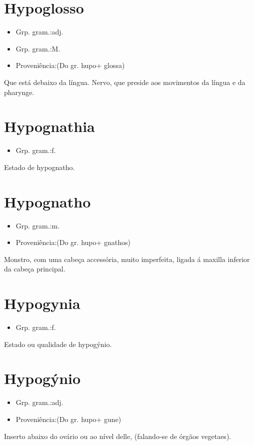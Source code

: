 \documentclass{article}
\begin{document}
\section{Hypoglosso}
\begin{itemize}
\item {Grp. gram.:adj.}
\end{itemize}
\begin{itemize}
\item {Grp. gram.:M.}
\end{itemize}
\begin{itemize}
\item {Proveniência:(Do gr. \textunderscore hupo\textunderscore  + \textunderscore glossa\textunderscore )}
\end{itemize}
Que está debaixo da língua.
Nervo, que preside aos movimentos da língua e da pharynge.
\section{Hypognathia}
\begin{itemize}
\item {Grp. gram.:f.}
\end{itemize}
Estado de hypognatho.
\section{Hypognatho}
\begin{itemize}
\item {Grp. gram.:m.}
\end{itemize}
\begin{itemize}
\item {Proveniência:(Do gr. \textunderscore hupo\textunderscore  + \textunderscore gnathos\textunderscore )}
\end{itemize}
Monstro, com uma cabeça accessória, muito imperfeita, ligada á maxilla inferior da cabeça principal.
\section{Hypogynia}
\begin{itemize}
\item {Grp. gram.:f.}
\end{itemize}
Estado ou qualidade de hypogýnio.
\section{Hypogýnio}
\begin{itemize}
\item {Grp. gram.:adj.}
\end{itemize}
\begin{itemize}
\item {Proveniência:(Do gr. \textunderscore hupo\textunderscore  + \textunderscore gune\textunderscore )}
\end{itemize}
Inserto abaixo do ovário ou ao nível delle, (falando-se de órgãos vegetaes).
\end{document}
